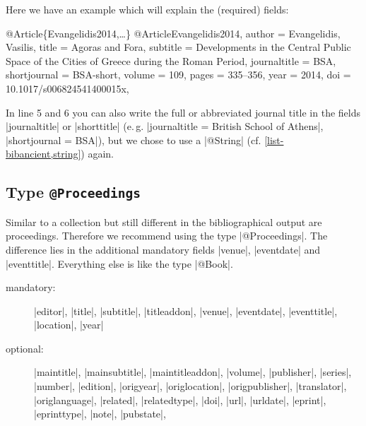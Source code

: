 \documentclass[a4paper,
10pt,
greek,
french,
spanish,
italian,
ngerman,
english
]{ltxdoc}
\begin{document}
Here we have an example which will explain the (required)  fields:
\begin{bibexample}[label=Evangelidis2014]{{@}Article\{Evangelidis2014,…\}}
@Article{Evangelidis2014,
  author       = {Evangelidis, Vasilis},
  title        = {Agoras {and} Fora},
  subtitle     = {Developments in the Central Public Space of the Cities of Greece during the {Roman} Period},
  journaltitle = BSA,    %
  shortjournal = BSA-short,    %
  volume       = {109},
  pages        = {335--356},
  year         = {2014},
  doi          = {10.1017/s006824541400015x},
}
\end{bibexample}
In line 5 and 6 you can also write the full or abbreviated journal title in the fields |journaltitle| or |shorttitle| (e.\,g. |journaltitle = {British School of Athens}|, |shortjournal = {BSA}|), but we chose to use a |@String| (cf. \cref{list-bibancient,string}) again.


\subsection{Type \texttt{@Proceedings}}\label{proceedings}
Similar to a collection but still different in the bibliographical output are proceedings.
Therefore we recommend  using the type |@Proceedings|.
The difference lies in the additional mandatory fields |venue|, |eventdate| and |eventtitle|. 
Everything else is like the type |@Book|.

\begin{description}
\item[mandatory:] 
|editor|, 
|title|, |subtitle|, |titleaddon|,
|venue|, |eventdate|, |eventtitle|,
|location|, |year|
\item[optional:]
|maintitle|, |mainsubtitle|, |maintitleaddon|, |volume|, 
|publisher|, |series|, |number|, |edition|, 
|origyear|, |origlocation|, |origpublisher|, 
|translator|, |origlanguage|,
|related|, |relatedtype|,
|doi|, |url|, |urldate|, |eprint|, |eprinttype|, |note|, |pubstate|, 
 \end{description}
 
\end{document}
